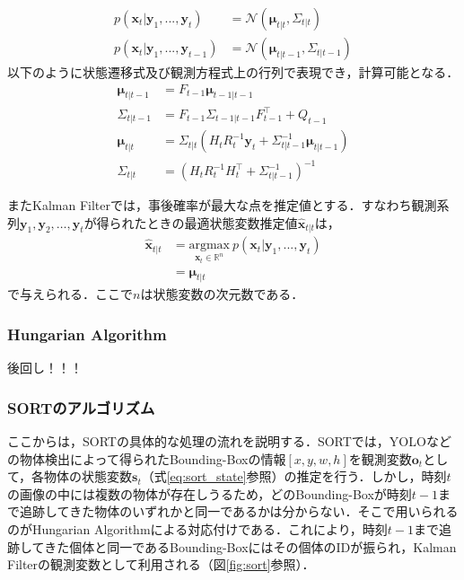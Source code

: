         \begin{equation}
            \label{eq:normal_format}
            \begin{aligned}
                p(\left. \bm{x}_t \right| \bm{y}_1,..., \bm{y}_t ) &= \mathcal{N}(\bm{\mu}_{t|t}, \Sigma_{t|t})
                \\ p(\left.\bm{x}_t\right| \bm{y}_1,..., \bm{y}_{t-1}) &= \mathcal{N}(\bm{\mu}_{t|t-1}, \Sigma_{t|t-1})
            \end{aligned}
        \end{equation}
        以下のように状態遷移式及び観測方程式上の行列で表現でき，計算可能となる．
        \begin{equation}
            \begin{aligned}
                \bm{\mu}_{t|t-1} &= F_{t-1} \bm{\mu}_{t-1|t-1}
                \\\Sigma_{t|t-1} &= F_{t-1} \Sigma_{t-1|t-1} F_{t-1}^{\top} + Q_{t-1}
                \\\bm{\mu}_{t|t} &= \Sigma_{t|t} \left( H_t R_t^{-1} \bm{y}_t + \Sigma_{t|t-1}^{-1} \bm{\mu}_{t|t-1} \right)
                \\\Sigma_{t|t} &= \left( H_t R_t^{-1} H_t^{\top} + \Sigma_{t|t-1}^{-1}\right)^{-1}
            \end{aligned}                    
        \end{equation}

        またKalman Filterでは，事後確率が最大な点を推定値とする．すなわち観測系列$\bm{y}_1,\bm{y}_2,\dots,\bm{y}_t$が得られたときの最適状態変数推定値$\hat{\bm{x}}_{t|t}$は，
        \begin{equation}
            \begin{aligned}
                \hat{\bm{x}}_{t|t} &= \underset{\bm{x}_t \in \mathbb{R}^{n}}{\text{argmax}}\ p(\left. \bm{x}_t \right| \bm{y}_1,..., \bm{y}_t )
                \\ &= \bm{\mu}_{t|t}
            \end{aligned}
        \end{equation}
        で与えられる．ここで$n$は状態変数の次元数である．

        \subsubsection{Hungarian Algorithm}
        後回し！！！

        \subsubsection{SORTのアルゴリズム}
        ここからは，SORTの具体的な処理の流れを説明する．SORTでは，YOLOなどの物体検出によって得られたBounding-Boxの情報$\left[x, y, w, h\right]$を観測変数$\bm{o}_t$として，各物体の状態変数$\bm{s}_t$（式\ref{eq:sort_state}参照）の推定を行う．しかし，時刻$t$の画像の中には複数の物体が存在しうるため，どのBounding-Boxが時刻$t-1$まで追跡してきた物体のいずれかと同一であるかは分からない．そこで用いられるのがHungarian Algorithmによる対応付けである．これにより，時刻$t-1$まで追跡してきた個体と同一であるBounding-Boxにはその個体のIDが振られ，Kalman Filterの観測変数として利用される（図\ref{fig:sort}参照）．

